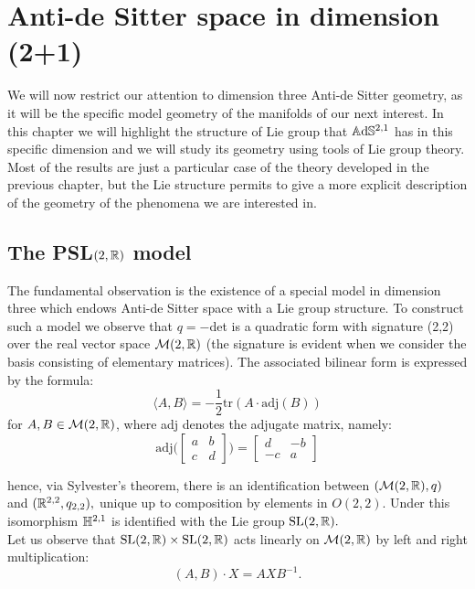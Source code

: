 \chapter{Anti-de Sitter space in dimension (2+1)}
We will now restrict our attention to dimension three Anti-de Sitter geometry, as it will be the specific model geometry of the manifolds of our next interest. In this chapter we will highlight the structure of Lie group that $\mathbb{A}\mathrm{d}\mathbb{S}^{2,1}$ has in this specific dimension and we will study its geometry using tools of Lie group theory. Most of the results are just a particular case of the theory developed in the previous chapter, but the Lie structure permits to give a more explicit description of the geometry of the phenomena we are interested in.\\

\section{The {PSL}$(2,\mathbb{R})$ model} 
The fundamental observation is the existence of a special model in dimension three which endows Anti-de Sitter space with a Lie group structure. To construct such a model we observe that $q=-$det is a quadratic form with signature (2,2) over the real vector space $\mathcal{M}(2,\mathbb{R})$ (the signature is evident when we consider the basis consisting of elementary matrices). The associated bilinear form is expressed by the formula:
\begin{equation}\label{quadratic}
    \langle A,B\rangle=-\frac{1}{2}\text{tr}(A\cdot\text{adj}(B))
\end{equation}
for $A,B\in\mathcal{M}(2,\mathbb{R})$, where adj denotes the adjugate matrix, namely: 
\[
\text{adj}\Big(\begin{bmatrix}
    a & b \\
    c & d
\end{bmatrix}\Big) = \begin{bmatrix}
    d & -b \\
    -c & a
\end{bmatrix}
\]

hence, via Sylvester's theorem, there is an identification between $(\mathcal{M}(2,\mathbb{R}),q)$ and $(\mathbb{R}^{2,2}, q_{2,2}),$ unique up to composition by elements in $O(2,2)$. Under this isomorphism $\mathbb{H}^{2,1}$ is identified with the Lie group $\text{SL}(2,\mathbb{R}).$\\
Let us observe that $\text{SL}(2,\mathbb{R})\times \text{SL}(2,\mathbb{R})$ acts linearly on $\mathcal{M}(2,\mathbb{R})$ by left and right multiplication:
$$(A,B)\cdot X=AXB^{-1}.$$

